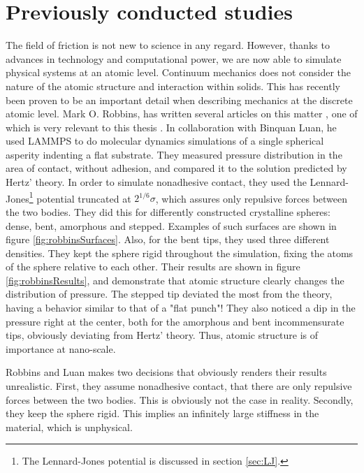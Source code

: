 \documentclass[twoside,english]{uiofysmaster}
\begin{document}
\section{Previously conducted studies}
The field of friction is not new to science in any regard. 
However, thanks to advances in technology and computational power, we are now able to simulate physical systems at an atomic level. 
Continuum mechanics does not consider the nature of the atomic structure and interaction within solids. 
This has recently been proven to be an important detail when describing mechanics at the discrete atomic level. 
Mark O. Robbins, has written several articles on this matter \cite{Robbins2005,RobbinsSingleAsperity,RobbinsSimpleMicroscopicTheroyOfAmontonsLawsOfFriction, RobbinsDefiningContactAtTheAtomicScale},  
one of which is very relevant to this thesis \cite{RobbinsSingleAsperity}. 
In collaboration with Binquan Luan, he used LAMMPS to do molecular dynamics simulations of a single spherical asperity indenting a flat substrate. 
They measured pressure distribution in the area of contact, without adhesion, and compared it to the solution predicted by Hertz' theory. 
In order to simulate nonadhesive contact, they used the Lennard-Jones\footnote{The Lennard-Jones potential is discussed in section \ref{sec:LJ}.} potential truncated at $2^{1/6}\sigma$, which assures only repulsive forces between the two bodies.
They did this for differently constructed crystalline spheres: dense, bent, amorphous and
stepped. 
Examples of such surfaces are shown in figure \ref{fig:robbinsSurfaces}.
Also, for the bent tips, they used three different densities. 
They kept the sphere rigid throughout the simulation, fixing the atoms of the sphere relative to each other. 
Their results are shown in figure \ref{fig:robbinsResults}, and demonstrate that atomic structure clearly changes the distribution of pressure.
The stepped tip deviated the most from the theory, having a behavior similar to that of a "flat punch"!  
They also noticed a dip in the pressure right at the center, both for the amorphous and bent incommensurate tips, obviously deviating from Hertz' theory.
Thus, atomic structure is of importance at nano-scale.



Robbins and Luan makes two decisions that obviously renders their results unrealistic. 
First, they assume nonadhesive contact, that there are only repulsive forces between the two bodies. 
This is obviously not the case in reality.
Secondly, they keep the sphere rigid. 
This implies an infinitely large stiffness in the material, which is unphysical. 
\end{document}
